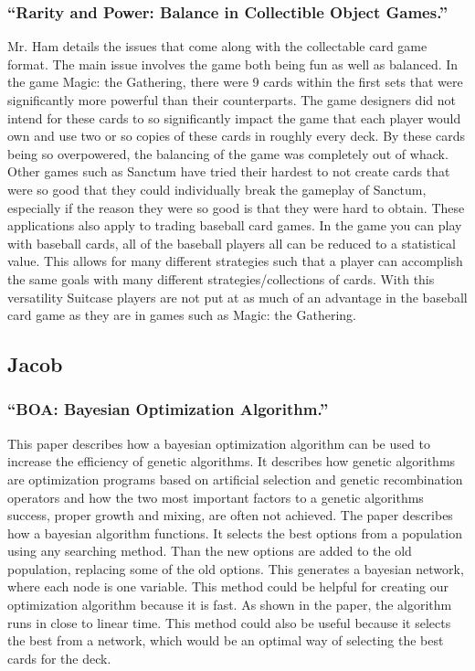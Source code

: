 \documentclass[12pt, letterpaper]{article}
\begin{document}
\subsubsection{\enquote{Rarity and Power: Balance in Collectible Object Games.}}

Mr. Ham details the issues that come along with the collectable card game format. The main issue involves the game both
being fun as well as balanced. In the game Magic: the Gathering, there were 9 cards within the first sets that were
significantly more powerful than their counterparts. The game designers did not intend for these cards to so
significantly impact the game that each player would own and use two or so copies of these cards in roughly every deck.
By these cards being so overpowered, the balancing of the game was completely out of whack. Other games such as Sanctum
have tried their hardest to not create cards that were so good that they could individually break the gameplay of
Sanctum, especially if the reason they were so good is that they were hard to obtain. These applications also apply to
trading baseball card games. In the game you can play with baseball cards, all of the baseball players all can be
reduced to a statistical value. This allows for many different strategies such that a player can accomplish the same
goals with many different strategies/collections of cards. With this versatility Suitcase players are not put at as much
of an advantage in the baseball card game as they are in games such as Magic: the Gathering.

\subsection{Jacob}

\subsubsection{\enquote{BOA: Bayesian Optimization Algorithm.}}

This paper describes how a bayesian optimization algorithm can be used to increase the efficiency of genetic algorithms.
It describes how genetic algorithms are optimization programs based on artificial selection and genetic recombination
operators and how the two most important factors to a genetic algorithms success, proper growth and mixing, are often
not achieved. The paper describes how a bayesian algorithm functions. It selects the best options from a population
using any searching method. Than the new options are added to the old population, replacing some of the old options.
This generates a bayesian network, where each node is one variable. This method could be helpful for creating our
optimization algorithm because it is fast. As shown in the paper, the algorithm runs in close to linear time. This
method could also be useful because it selects the best from a network, which would be an optimal way of selecting the
best cards for the deck.
\end{document}
